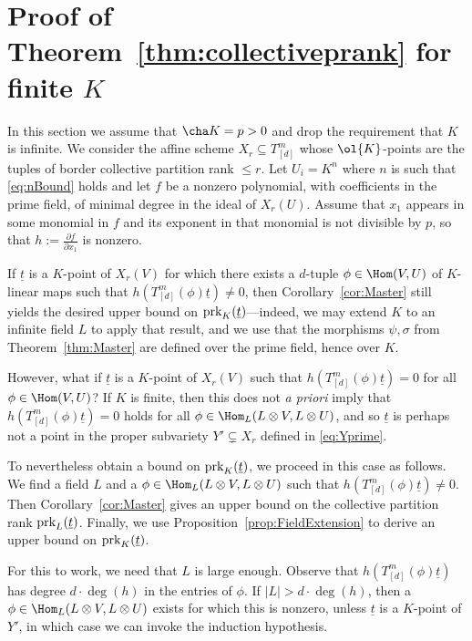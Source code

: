 \documentclass{amsart}
\newcommand{\prk}{\textnormal{prk}}
\newcommand{\ul}[1]{\underline{#1}}
\begin{document}
\section{Proof of Theorem~\ref{thm:collectiveprank} for finite $K$}

In this section we assume that $\cha K=p>0$ and drop the requirement that
$K$ is infinite. We consider the affine scheme $X_r \subseteq T_{[d]}^m$
whose $\ol{K}$-points are the tuples of border collective partition rank
$\leq r$. Let $U_i=K^n$ where $n$ is such that \eqref{eq:nBound}
holds and let $f$ be a nonzero polynomial, with coefficients in the prime
field, of minimal degree in the ideal of $X_r(U)$. Assume that $x_1$
appears in some monomial in $f$ and its exponent in that monomial is not
divisible by $p$, so that $h:=\frac{\partial f}{\partial x_1}$ is nonzero.

If $\ul{t}$ is a $K$-point of $X_r(V)$ for which there exists a $d$-tuple
$\phi \in \Hom(V,U)$ of $K$-linear maps such that
$h(T^m_{[d]}(\phi)\ul{t})
\neq 0$, then Corollary~\ref{cor:Master} still yields the desired upper
bound on $\prk_K(\ul{t})$---indeed, we may extend $K$ to an infinite field $L$
to apply that result, and we use that the morphisms $\psi,\sigma$ from
Theorem~\ref{thm:Master} are defined over the prime field, hence over $K$.

However, what if $\ul{t}$ is a $K$-point of $X_r(V)$ such that
$h(T^m_{[d]}(\phi) \ul{t})=0$ for all $\phi \in \Hom(V,U)$? If $K$ is finite,
then this does not {\em a priori} imply that $h(T^m_{[d]}(\phi)\ul{t})=0$
holds for all $\phi \in \Hom_L(L \otimes V, L \otimes U)$, and so
$\ul{t}$
is perhaps not a point in the proper subvariety $Y' \subsetneq X_r$
defined in \eqref{eq:Yprime}.

To nevertheless obtain a bound on $\prk_K(\ul{t})$, we proceed in this case as follows. We
find a field $L$ and a $\phi \in \Hom_L(L \otimes V, L \otimes U)$
such that $h(T^m_{[d]}(\phi)\ul{t}) \neq 0$. Then Corollary~\ref{cor:Master}
gives an upper bound on the collective partition rank $\prk_L(\ul{t})$.  Finally,
we use Proposition~\ref{prop:FieldExtension} to derive an upper bound
on $\prk_K(\ul{t})$.

For this to work, we need that $L$ is large enough. Observe that
$h(T^m_{[d]}(\phi)\ul{t})$ has degree $d \cdot \deg(h)$ in the entries of $\phi$.
If $|L|>d \cdot \deg(h)$, then a $\phi \in \Hom_L(L \otimes V, L \otimes U)$
exists for which this is nonzero, unless $\ul{t}$ is a $K$-point of $Y'$,
in which case we can invoke the induction hypothesis.
\end{document}
